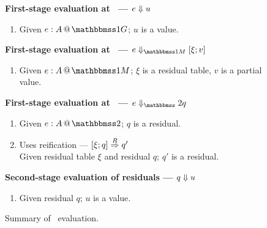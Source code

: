 
\begin{figure}
\begin{abstrsyn}

\textbf{First-stage evaluation at \bbonep\ ---
${e} \Downarrow {u}$}
\begin{enumerate}
\item[] Given $\colpure e A$;
$u$ is a value.
\end{enumerate}

\textbf{First-stage evaluation at \bbonem\ ---
$\diaone e {\xi;v}$}
\begin{enumerate}
\item[] Given $\colmix e A$;
$\xi$ is a residual table, 
$v$ is a partial value.
\end{enumerate}

\textbf{First-stage evaluation at \bbtwo\ ---
$\diatwo e q$}
\begin{enumerate}
\item[] Given $\coltwo e A$;
$q$ is a residual.
\item[] Uses reification --- $[{\xi};{q}]\overset{R}\Rightarrow{q}'$ \\
Given residual table $\xi$ and residual $q$; $q'$ is a residual.
\end{enumerate}

\textbf{Second-stage evaluation of residuals ---
${q} \Downarrow {u}$}
\begin{enumerate}
\item[] Given residual $q$;
$u$ is a value.
\end{enumerate}

\end{abstrsyn}
\caption{Summary of \lang\ evaluation.}
\label{fig:dynamicsSummary}
\end{figure}

